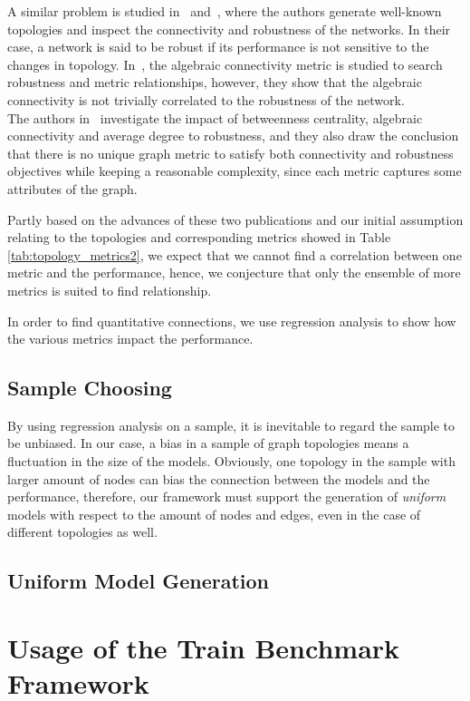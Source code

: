 A similar problem is studied in~\cite{algebraic1} and~\cite{algebraic2}, where the authors generate well-known topologies and inspect the connectivity and robustness of the networks. In their case, a network is said to be robust if its performance is not sensitive to the changes in topology. In~\cite{algebraic1}, the algebraic connectivity metric is studied to search robustness and metric relationships, however, they show that the algebraic connectivity is not trivially correlated to the robustness of the network.\\
The authors in~\cite{algebraic2} investigate the impact of betweenness centrality, algebraic connectivity and average degree to robustness, and they also draw the conclusion that there is no unique graph metric to satisfy both connectivity and robustness objectives while keeping a reasonable complexity, since each metric captures some attributes of the graph.

Partly based on the advances of these two publications and our initial assumption relating to the topologies and corresponding metrics showed in Table \ref{tab:topology_metrics2}, we expect that we cannot find a correlation between one metric and the performance, hence, we conjecture that only the ensemble of more metrics is suited to find relationship.

In order to find quantitative connections, we use regression analysis to show how the various metrics impact the performance. 

\subsection{Sample Choosing}

By using regression analysis on a sample, it is inevitable to regard the sample to be unbiased. In our case, a bias in a sample of graph topologies means a fluctuation in the size of the models. Obviously, one topology in the sample with larger amount of nodes can bias the connection between the models and the performance, therefore, our framework must support the generation of \textit{uniform} models with respect to the amount of nodes and edges, even in the case of different topologies as well.

\subsection{Uniform Model Generation}



\section{Usage of the Train Benchmark Framework}

